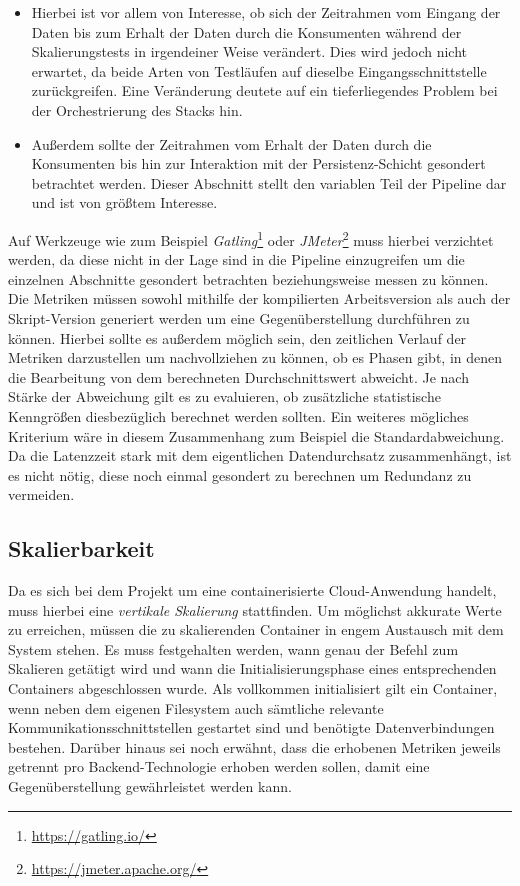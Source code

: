 \begin{itemize}
  \item Hierbei ist vor allem von Interesse, ob sich der Zeitrahmen vom Eingang der Daten bis zum Erhalt der Daten durch die Konsumenten während der Skalierungstests in irgendeiner Weise verändert. Dies wird jedoch nicht erwartet, da beide Arten von Testläufen auf dieselbe Eingangsschnittstelle zurückgreifen. Eine Veränderung deutete auf ein tieferliegendes Problem bei der Orchestrierung des Stacks hin.
  \item Außerdem sollte der Zeitrahmen vom Erhalt der Daten durch die Konsumenten bis hin zur Interaktion mit der Persistenz-Schicht gesondert betrachtet werden. Dieser Abschnitt stellt den variablen Teil der Pipeline dar und ist von größtem Interesse. 
\end{itemize}

Auf Werkzeuge wie zum Beispiel \emph{Gatling}\footnote{\url{https://gatling.io/}} oder \emph{JMeter}\footnote{\url{https://jmeter.apache.org/}} muss hierbei verzichtet werden, da diese nicht in der Lage sind in die Pipeline einzugreifen um die einzelnen Abschnitte gesondert betrachten beziehungsweise messen zu können. Die Metriken müssen sowohl mithilfe der kompilierten Arbeitsversion als auch der Skript-Version generiert werden um eine Gegenüberstellung durchführen zu können. Hierbei sollte es außerdem möglich sein, den zeitlichen Verlauf der Metriken darzustellen um nachvollziehen zu können, ob es Phasen gibt, in denen die Bearbeitung von dem berechneten Durchschnittswert abweicht. Je nach Stärke der Abweichung gilt es zu evaluieren, ob zusätzliche statistische Kenngrößen diesbezüglich berechnet werden sollten. Ein weiteres mögliches Kriterium wäre in diesem Zusammenhang zum Beispiel die Standardabweichung. Da die Latenzzeit stark mit dem eigentlichen Datendurchsatz zusammenhängt, ist es nicht nötig, diese noch einmal gesondert zu berechnen um Redundanz zu vermeiden.


\subsection{Skalierbarkeit}
Da es sich bei dem Projekt um eine containerisierte Cloud-Anwendung handelt, muss hierbei eine \emph{vertikale Skalierung} stattfinden. Um möglichst akkurate Werte zu erreichen, müssen die zu skalierenden Container in engem Austausch mit dem System stehen. Es muss festgehalten werden, wann genau der Befehl zum Skalieren getätigt wird und wann die Initialisierungsphase eines entsprechenden Containers abgeschlossen wurde. Als vollkommen initialisiert gilt ein Container, wenn neben dem eigenen Filesystem auch sämtliche relevante Kommunikationsschnittstellen gestartet sind und benötigte Datenverbindungen bestehen. Darüber hinaus sei noch erwähnt, dass die erhobenen Metriken jeweils getrennt pro Backend-Technologie erhoben werden sollen, damit eine Gegenüberstellung gewährleistet werden kann.

